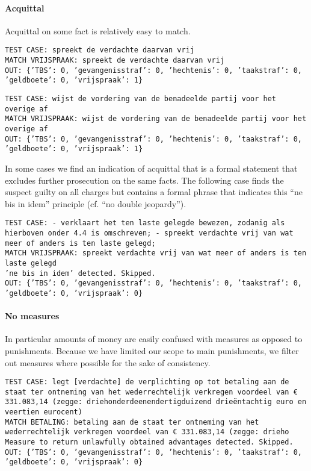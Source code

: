 \documentclass[a4paper]{article}
\begin{document}
\paragraph{Acquittal}

Acquittal on some fact is relatively easy to match.

\texttt{TEST CASE: %
spreekt de verdachte daarvan vrij\\
MATCH VRIJSPRAAK: spreekt de verdachte daarvan vrij\\
OUT: \{'TBS': 0, 'gevangenisstraf': 0, 'hechtenis': 0, 'taakstraf': 0, 'geldboete': 0, 'vrijspraak': 1\}}

\texttt{TEST CASE: %
wijst de vordering van de benadeelde partij voor het overige af\\
MATCH VRIJSPRAAK: wijst de vordering van de benadeelde partij voor het overige af\\
OUT: \{'TBS': 0, 'gevangenisstraf': 0, 'hechtenis': 0, 'taakstraf': 0, 'geldboete': 0, 'vrijspraak': 1\}}

In some cases we find an indication of acquittal that is a formal statement that excludes further prosecution on the same facts.
The following case finds the suspect guilty on all charges but contains a formal phrase that indicates this ``ne bis in idem'' principle (cf. ``no double jeopardy'').

\texttt{TEST CASE: %
- verklaart het ten laste gelegde bewezen, zodanig als hierboven onder 4.4 is omschreven; - spreekt verdachte vrij van wat meer of anders is ten laste gelegd;\\
MATCH VRIJSPRAAK: spreekt verdachte vrij van wat meer of anders is ten laste gelegd\\
'ne bis in idem' detected. Skipped.\\
OUT: \{'TBS': 0, 'gevangenisstraf': 0, 'hechtenis': 0, 'taakstraf': 0, 'geldboete': 0, 'vrijspraak': 0\}}

\paragraph{No measures}

In particular amounts of money are easily confused with measures as opposed to punishments.
Because we have limited our scope to main punishments, we filter out measures where possible for the sake of consistency.

\texttt{TEST CASE: %
legt [verdachte] de verplichting op tot betaling aan de staat ter ontneming van het wederrechtelijk verkregen voordeel van € 331.083,14 (zegge: driehonderdeenendertigduizend drieëntachtig euro en veertien eurocent)\\
MATCH BETALING: betaling aan de staat ter ontneming van het wederrechtelijk verkregen voordeel van € 331.083,14 (zegge: drieho\\
Measure to return unlawfully obtained advantages detected. Skipped.\\
OUT: \{'TBS': 0, 'gevangenisstraf': 0, 'hechtenis': 0, 'taakstraf': 0, 'geldboete': 0, 'vrijspraak': 0\}}
\end{document}
